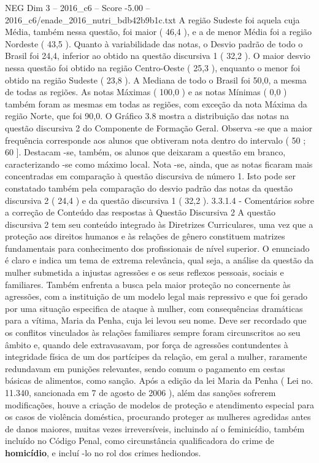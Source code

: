 \begin{textsample}{NEG Dim 3 – 2016\_c6 – Score -5.00 – 2016\_c6/enade\_2016\_nutri\_bdb42b9b1c.txt}
A região Sudeste foi aquela cuja Média, também nessa questão, foi maior ( 46,4 ), e a de menor Média foi a região Nordeste ( 43,5 ).
Quanto à variabilidade das notas, o Desvio padrão de todo o Brasil foi 24,4, inferior ao obtido na questão discursiva 1 ( 32,2 ).
O maior desvio nessa questão foi obtido na região Centro-Oeste ( 25,3 ), enquanto o menor foi obtido na região Sudeste ( 23,8 ).
A Mediana de todo o Brasil foi 50,0, a mesma de todas as regiões.
As notas Máximas ( 100,0 ) e as notas Mínimas ( 0,0 ) também foram as mesmas em todas as regiões, com exceção da nota Máxima da região Norte, que foi 90,0.
O Gráfico 3.8 mostra a distribuição das notas na questão discursiva 2 do Componente de Formação Geral.
Observa -se que a maior frequência corresponde aos alunos que obtiveram nota dentro do intervalo ( 50 ; 60 ].
Destacam -se, também, os alunos que deixaram a questão em branco, caracterizando -se como máximo local.
Nota -se, ainda, que as notas ficaram mais concentradas em comparação à questão discursiva de número 1.
Isto pode ser constatado também pela comparação do desvio padrão das notas da questão discursiva 2 ( 24,4 ) e da questão discursiva 1 ( 32,2 ). 3.3.1.4 - Comentários sobre a correção de Conteúdo das respostas à Questão Discursiva 2 A questão discursiva 2 tem seu conteúdo integrado às Diretrizes Curriculares, uma vez que a proteção aos direitos humanos e às relações de gênero constituem matrizes fundamentais para conhecimento dos profissionais de nível superior.
O enunciado é claro e indica um tema de extrema relevância, qual seja, a análise da questão da mulher submetida a injustas agressões e os seus reflexos pessoais, sociais e familiares.
Também enfrenta a busca pela maior proteção no concernente às agressões, com a instituição de um modelo legal mais repressivo e que foi gerado por uma situação especifica de ataque à mulher, com consequências dramáticas para a vítima, Maria da Penha, cuja lei levou seu nome.
Deve ser recordado que os conflitos vinculados às relações familiares sempre foram circunscritos ao seu âmbito e, quando dele extravasavam, por força de agressões contundentes à integridade física de um dos partícipes da relação, em geral a mulher, raramente redundavam em punições relevantes, sendo comum o pagamento em cestas básicas de alimentos, como sanção.
Após a edição da lei Maria da Penha ( Lei no. 11.340, sancionada em 7 de agosto de 2006 ), além das sanções sofrerem modificações, houve a criação de modelos de proteção e atendimento especial para os casos de violência doméstica, procurando proteger as mulheres agredidas antes de danos maiores, muitas vezes irreversíveis, incluindo aí o feminicídio, também incluído no Código Penal, como circunstância qualificadora do crime de \textbf{homicídio}, e incluí -lo no rol dos crimes hediondos.

\end{textsample}
